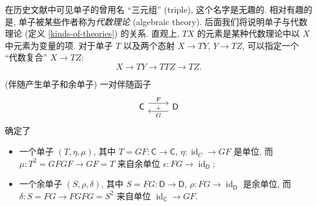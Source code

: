 \begin{remark}
	{}
	在历史文献中可见单子的曾用名 ``三元组'' (triple), 这个名字是无趣的.
	相对有趣的是, 单子被某些作者称为\emph{代数理论} (algebraic theory). 后面我们将说明单子与代数理论 (定义 \ref{kinds-of-theories}) 的关系. 直观上, $TX$ 的元素是某种代数理论中以 $X$ 中元素为变量的项. 对于单子 $T$ 以及两个态射 $X\to TY$, $Y\to TZ$, 可以指定一个 ``代数复合'' $X\to TZ$:
	\[
	X\to TY \to TTZ\to TZ.
	\]
\end{remark}

\begin{propdef}
    [label={monad-from-adjoint}]
    {(伴随产生单子和余单子)}
    一对伴随函子
    $$
    \begin{tikzcd}[ampersand replacement=\&]
    	{\mathsf C} \& {\mathsf D}
    	\arrow[""{name=0, anchor=center, inner sep=0}, "G", shift left=2, from=1-2, to=1-1]
    	\arrow[""{name=1, anchor=center, inner sep=0}, "F", shift left=2, from=1-1, to=1-2]
    	\arrow["\dashv"{anchor=center, rotate=-90}, draw=none, from=1, to=0]
    \end{tikzcd}
    $$
    确定了
    \begin{itemize}
    	\item 一个单子 $(T,\eta,\mu)$, 其中 $T = GF \colon \mathsf C \to \mathsf C$,
    	$\eta \colon \operatorname{id}_{C} \to GF$ 是单位, 而 $\mu \colon T^2 = GFGF \to GF = T$ 来自余单位 $\epsilon \colon FG \to \operatorname{id}_{\mathsf D}$;
    	\item 一个余单子 $(S,\rho,\delta)$, 其中 $S=FG\colon \mathsf {D}\to\mathsf {D}$,
    	$\rho \colon FG\to\operatorname{id}_{\mathsf D}$ 是余单位, 而 $\delta\colon S= FG\to FGFG = S^2$ 来自单位 $\operatorname{id}_{\mathsf C}\to GF$.
    \end{itemize}
\end{propdef}

